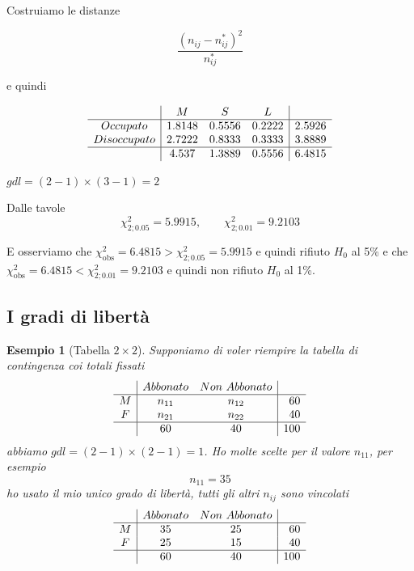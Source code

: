 \documentclass[
  11pt,
]{book}
\theoremstyle{mytheoremstyle}
\theoremstyle{mydefstyle}
\newtheorem{example}{{Esempio}}[section]
\begin{document}
Costruiamo le distanze

\[\frac{\left(n_{ij}-n_{ij}^*\right)^2}{n_{ij}^*}\]

e quindi

\[\begin{array}{c|ccc|r}
         &M &S &L  & \\   \hline
Occupato    & 1.8148     & 0.5556     & 0.2222     & 2.5926\\
Disoccupato & 2.7222     & 0.8333     & 0.3333     & 3.8889\\ \hline
         & 4.537 & 1.3889 & 0.5556 & 6.4815
\end{array}\]

\(gdl=(2-1)\times(3-1)=2\)

Dalle tavole
\[\chi_{2;0.05}^2=5.9915,\qquad \chi_{2;0.01}^2=9.2103\]

E osserviamo che \(\chi_{\text{obs}}^2=6.4815>\chi_{2;0.05}^2=5.9915\) e quindi rifiuto \(H_0\) al 5\% e che \(\chi_{\text{obs}}^2=6.4815<\chi_{2;0.01}^2=9.2103\) e quindi non rifiuto \(H_0\) al 1\%.

\subsection{I gradi di libertà}\label{i-gradi-di-libertuxe0}

\begin{example}[Tabella $2\times 2$]
Supponiamo di voler riempire la tabella di contingenza coi totali fissati
\[
\begin{array}{c|cc|r}
         &Abbonato &Non~Abbonato   & \\   \hline
M    & n_{11}     & n_{12}    & 60\\
F & n_{21}     & n_{22}     & 40\\ \hline
         & 60 & 40 & 100
\end{array}
\]
abbiamo \(gdl=(2-1)\times(2-1)=1\). Ho molte scelte per il valore \(n_{11}\), per esempio
\[n_{11}=35\]
ho usato il mio unico grado di libertà, tutti gli altri \(n_{ij}\) sono vincolati
\[
\begin{array}{c|cc|r}
         &Abbonato &Non~Abbonato   & \\   \hline
M    & 35     & 25    & 60\\
F & 25     & 15     & 40\\ \hline
         & 60 & 40 & 100
\end{array}
\]
\end{example}
\end{document}
